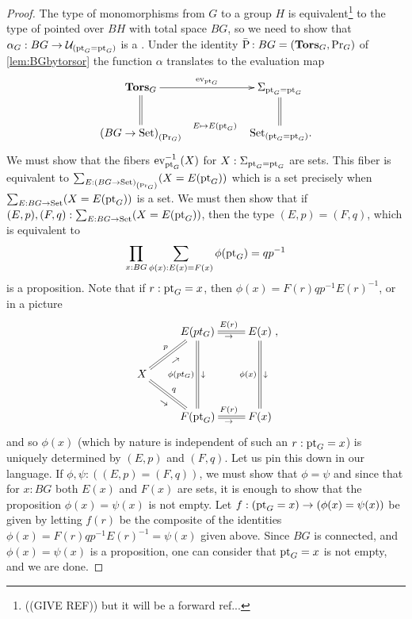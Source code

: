 \begin{proof}
  The type of monomorphisms from $G$ to a group $H$ is
  equivalent\footnote{((GIVE REF)) but it will be a forward ref...} to
  the type of pointed \coverings over $BH$ with total space $BG$, so
  we need to show that $\alpha_G:BG\to{\mathcal{U}}_{(\mathrm{pt}_G=\mathrm{pt}_G)}$ is a
  \covering.  Under the identity
  $\bar{\mathrm{P}_{\!}}:BG=(\mathbf{Tors}_G,\mathrm{Pr}_{{G}})$ of
  \cref{lem:BGbytorsor} the function $\alpha$ translates to the
  evaluation map
  $$\xymatrix{
    \typetorsor_G\ar[rr]^-{\mathrm{ev}_{\pt_G}}\ar@{=}[d]&&\Sigma_{\pt_G=\pt_G}\ar@{=}[d]\\
    \conncomp{(BG\to\Set)}{\princ G}\ar@{}[rr]^-{E\mapsto E(\pt_G)}&&
    \,\conncomp{\Set}{\pt_G=\pt_G}.  }$$ We must show that the fibers
  $\mathrm{ev}_{\mathrm{pt}_G}^{-1}(X)$ for $X:\Sigma_{\mathrm{pt}_G=\mathrm{pt}_G}$ are sets.  This
  fiber is equivalent to
  $\sum_{E:{{(BG\to\mathord{\mathrm{Set}})}_{\left(\mathrm{Pr}_{{G}}\right)}}}(X=E(\mathrm{pt}_G))$ which is a
  set precisely when $\sum_{E:BG\to\mathord{\mathrm{Set}}}(X=E(\mathrm{pt}_G))$ is a set.  We
  must then show that if $(E,p),(F,q):\sum_{E:BG\to\mathord{\mathrm{Set}}}(X=E(\mathrm{pt}_G))$,
  then the type $(E,p)=(F,q)$, which is equivalent
  to
  $$\prod_{x:BG}\sum_{\phi(x):E(x)=F(x)}\phi(\mathrm{pt}_G)=qp^{-1}$$
  is a proposition.  Note that if $r:\mathrm{pt}_G=x$, then
  $\phi(x)=F(r)qp^{-1}E(r)^{-1}$, or in a picture
  \begin{displaymath}
    \xymatrix{&E(pt_G)\ar@{=}[r]^{E(r)}_\to\ar@{=}[dd]_{\phi(pt_G)}^\downarrow&E(x)\ar@{=}[dd]_{\phi(x)}^\downarrow\\
      X\ar@{=}[ur]^p_{\rotatebox{35}{\footnotesize$\to$}}\ar@{=}[dr]^q_{\rotatebox{-35}{\footnotesize$\to$}}&&\\
      &F(\pt_G)\ar@{=}[r]^{F(r)}_\to&F(x)},
  \end{displaymath}
  and so $\phi(x)$ (which by nature is independent of such an
  $r:\mathrm{pt}_G=x$) is uniquely determined by $(E,p)$ and $(F,q)$.  Let us
  pin this down in our language.  If $\phi,\psi:((E,p)=(F,q))$, we
  must show that $\phi=\psi$ and since that for $x:BG$ both $E(x)$ and
  $F(x)$ are sets, it is enough to show that the proposition
  $\phi(x)=\psi(x)$ is not empty.  Let
  $f:(\mathrm{pt}_G=x)\to(\phi(x)=\psi(x))$ be given by letting $f(r)$ be the
  composite of the identities $\phi(x)=F(r)qp^{-1}E(r)^{-1}=\psi(x)$
  given above.  Since $BG$ is connected, and $\phi(x)=\psi(x)$ is a
  proposition, one can consider that $\mathrm{pt}_G=x$ is not empty, and we
  are done.
\end{proof}

